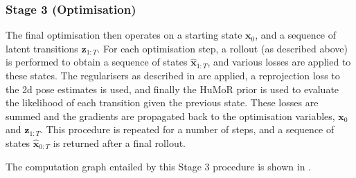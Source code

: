 \subsubsection{Stage 3 (Optimisation)}
The final optimisation then operates on a starting state $\mathbf{x}_0$, and a sequence of latent transitions $\textbf{z}_{1:T}$. For each optimisation step, a rollout (as described above) is performed to obtain a sequence of states $\mathbf{\hat{x}}_{1:T}$, and various losses are applied to these states. The regularisers as described in  are applied, a reprojection loss to the 2d pose estimates is used, and finally the HuMoR prior is used to evaluate the likelihood of each transition given the previous state. These losses are summed and the gradients are propagated back to the optimisation variables, $\mathbf{x}_0$ and $\textbf{z}_{1:T}$. This procedure is repeated for a number of steps, and a sequence of states $\mathbf{\hat{x}}_{0:T}$ is returned after a final rollout.

The computation graph entailed by this Stage 3 procedure is shown in .
